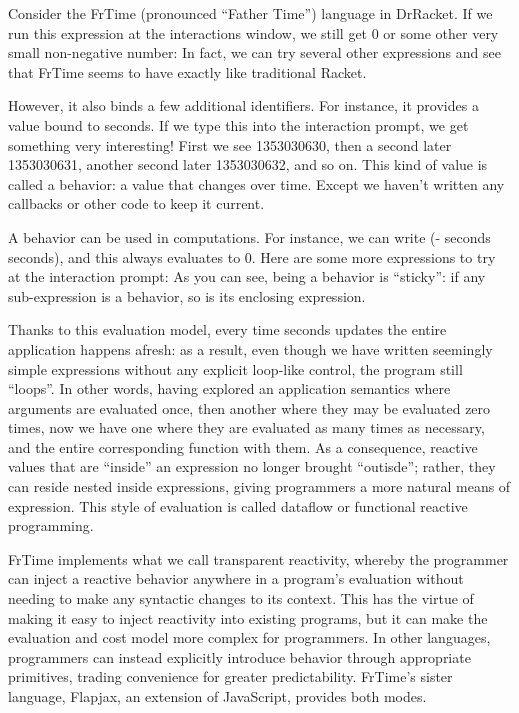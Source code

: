 
Consider the FrTime (pronounced “Father Time”) language in DrRacket. If we run
this expression at the interactions window, we still get 0 or some other very
small non-negative number:
In fact, we can try several other expressions and see that FrTime seems to have
exactly like traditional Racket.

However, it also binds a few additional identifiers. For instance, it provides a
value bound to seconds. If we type this into the interaction prompt, we get
something very interesting! First we see 1353030630, then a second later
1353030631, another second later 1353030632, and so on. This kind of value is
called a behavior: a value that changes over time. Except we haven’t written any
callbacks or other code to keep it current.

A behavior can be used in computations. For instance, we can write (- seconds
seconds), and this always evaluates to 0. Here are some more expressions to try
at the interaction prompt:
As you can see, being a behavior is “sticky”: if any sub-expression is a
behavior, so is its enclosing expression.

Thanks to this evaluation model, every time seconds updates the entire
application happens afresh: as a result, even though we have written seemingly
simple expressions without any explicit loop-like control, the program still
“loops”. In other words, having explored an application semantics where
arguments are evaluated once, then another where they may be evaluated zero
times, now we have one where they are evaluated as many times as necessary, and
the entire corresponding function with them. As a consequence, reactive values
that are “inside” an expression no longer brought “outisde”; rather, they can
reside nested inside expressions, giving programmers a more natural means of
expression. This style of evaluation is called dataflow or functional reactive
programming.

FrTime implements what we call transparent reactivity, whereby the programmer
can inject a reactive behavior anywhere in a program’s evaluation without
needing to make any syntactic changes to its context. This has the virtue of
making it easy to inject reactivity into existing programs, but it can make the
evaluation and cost model more complex for programmers. In other languages,
programmers can instead explicitly introduce behavior through appropriate
primitives, trading convenience for greater predictability. FrTime’s sister
language, Flapjax, an extension of JavaScript, provides both modes.
